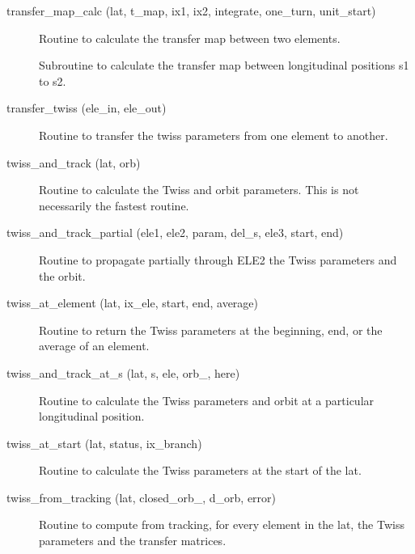 \begin{description}
\label{r:transfer.map.calc}
\item[transfer_map_calc (lat, t_map, ix1, ix2, integrate, one_turn, unit_start) ] \Newline 
Routine to calculate the transfer map between two elements.

\label{r:transfer.map.from.s.to.s}
\item[\protect\parbox{6in}{
    transfer_map_from_s_to_s (lat, t_map, s1, s2, ix_branch, integrate, \\
    \hspace*{1in} one_turn, unit_start, err_flag) }] \Newline 
Subroutine to calculate the transfer map between longitudinal positions
s1 to s2.

\label{r:transfer.twiss}
\item[transfer_twiss (ele_in, ele_out)] \Newline 
Routine to transfer the twiss parameters from one element to another.

\item[twiss_and_track (lat, orb)] \Newline
Routine to calculate the Twiss and orbit parameters. 
This is not necessarily the fastest routine. 

\item[twiss_and_track_partial (ele1, ele2, param, del_s, ele3, start, end)] \Newline
Routine to propagate partially through ELE2 the Twiss parameters and the orbit. 

\label{r:twiss.at.element}
\item[twiss_at_element (lat, ix_ele, start, end, average)] \Newline
Routine to return the Twiss parameters at the beginning, end, or the average of an element. 

\item[twiss_and_track_at_s (lat, s, ele, orb_, here)] \Newline
Routine to calculate the Twiss parameters and orbit at a particular longitudinal position. 

\label{r:twiss.at.start}
\item[twiss_at_start (lat, status, ix_branch)] \Newline
Routine to calculate the Twiss parameters at the start of the lat. 

\label{r:twiss.from.tracking}
\item[twiss_from_tracking (lat, closed_orb_, d_orb, error)] \Newline
Routine to compute from tracking, for every element in the lat, 
the Twiss parameters and the transfer matrices. 


\end{description}
